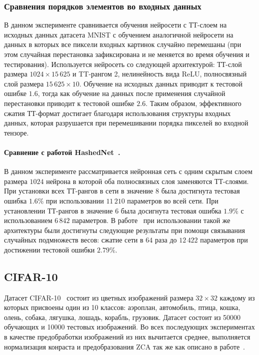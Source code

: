  \subsubsection{Сравнения порядков элементов во входных данных}
В данном эксперименте сравнивается обучения нейросети с ТТ-слоем на исходных данных датасета MNIST с обучением аналогичной нейросети на данных в которых все пиксели входных картинок случайно перемешаны (при этом случайная перестановка зафиксирована и не меняется во время обучения и тестирования). Используется нейросеть со следующей архитектурой: ТТ-слой размера $1024 \times 15\,625$ и TT-рангом 2, нелинейность вида ReLU, полносвязный слой размера $15\,625 \times 10$. Обучение на исходных данных приводит к тестовой ошибке $1.6$, тогда как обучение на данных после применения случайной перестановки приводит к тестовой ошибке $2.6$. Таким образом, эффективного сжатия ТТ-формат достигает благодаря использования структуры входных данных, которая разрушается при перемешивании порядка пикселей во входной тензоре.


\paragraph{Сравнение с работой HashedNet~\cite{chen2015compressing}.} В данном эксперименте рассматривается нейронная сеть с одним скрытым слоем размера $1024$ нейрона в которой оба полносвязных слоя заменяются ТТ-слоями. При установки всех ТТ-рангов в сети в значение 8 была достигнута тестовая ошибка $1.6\%$ при использовании $11\,210$ параметров во всей сети. При установлении ТТ-рангов в значение 6 была досигнута тестовая ошибка $1.9\%$ с использованием $6\,842$ параметров. В работе~\cite{chen2015compressing} при использовании такой же архитектуры были достигнуты следующие результаты при помощи связывания случайных подмножеств весов: сжатие сети в $64$ раза до  $12\,422$ параметров при достижении тестовой ошибки $2.79\%$.\\

\subsection{CIFAR-10}
Датасет CIFAR-10~\cite{krizhevsky2009Cifar} состоит из цветных изображений размера $32 \times 32$ каждому из которых присвоены один из 10 классов: аэроплан, автомобиль, птица, кошка, олень, собака, лягушка, лошадь, корабль, грузовик. Датасет состоит из  50000 обучающих и 10000 тестовых изображений. Во всех последующих экспериментах в качестве предобработки изображений из них вычитается среднее, выполняется нормализация конраста и предобразования ZCA так же как описано в работе~\cite{goodfellow2013maxout}.

